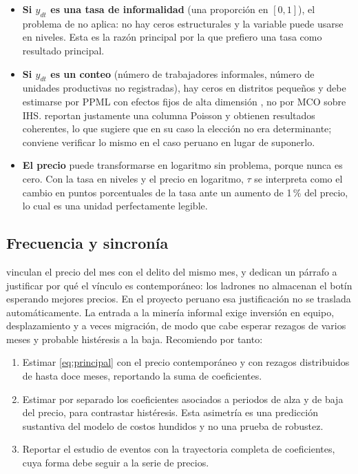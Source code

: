 \documentclass[11pt,a4paper]{article}
\begin{document}
\begin{itemize}[leftmargin=1.6em,itemsep=2pt]
\item \textbf{Si $y_{dt}$ es una tasa de informalidad} (una proporción en $[0,1]$), el problema de \citet{chen2024} no aplica: no hay ceros estructurales y la variable puede usarse en niveles. Esta es la razón principal por la que prefiero una tasa como resultado principal.
\item \textbf{Si $y_{dt}$ es un conteo} (número de trabajadores informales, número de unidades productivas no registradas), hay ceros en distritos pequeños y debe estimarse por PPML con efectos fijos de alta dimensión \citep{correia2020}, no por MCO sobre IHS. \citet{braakmann2024} reportan justamente una columna Poisson y obtienen resultados coherentes, lo que sugiere que en su caso la elección no era determinante; conviene verificar lo mismo en el caso peruano en lugar de suponerlo.
\item \textbf{El precio} puede transformarse en logaritmo sin problema, porque nunca es cero. Con la tasa en niveles y el precio en logaritmo, $\tau$ se interpreta como el cambio en puntos porcentuales de la tasa ante un aumento de 1\,\% del precio, lo cual es una unidad perfectamente legible.
\end{itemize}

\subsection{Frecuencia y sincronía}

\citet{braakmann2024} vinculan el precio del mes con el delito del mismo mes, y dedican un párrafo a justificar por qué el vínculo es contemporáneo: los ladrones no almacenan el botín esperando mejores precios. En el proyecto peruano esa justificación no se traslada automáticamente. La entrada a la minería informal exige inversión en equipo, desplazamiento y a veces migración, de modo que cabe esperar rezagos de varios meses y probable histéresis a la baja. Recomiendo por tanto:
\begin{enumerate}[leftmargin=1.6em,itemsep=1pt]
\item Estimar \eqref{eq:principal} con el precio contemporáneo y con rezagos distribuidos de hasta doce meses, reportando la suma de coeficientes.
\item Estimar por separado los coeficientes asociados a periodos de alza y de baja del precio, para contrastar histéresis. Esta asimetría es una predicción sustantiva del modelo de costos hundidos y no una prueba de robustez.
\item Reportar el estudio de eventos con la trayectoria completa de coeficientes, cuya forma debe seguir a la serie de precios.
\end{enumerate}
\end{document}
